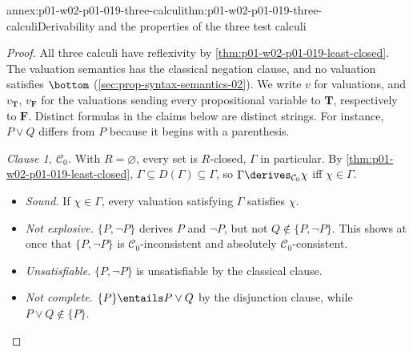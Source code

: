 \begin{annexitem}{annex:p01-w02-p01-019-three-calculi}{thm:p01-w02-p01-019-three-calculi}{Derivability and the properties of the three test calculi}
\begin{proof}
All three calculi have reflexivity by
\cref{thm:p01-w02-p01-019-least-closed}. The valuation semantics has the
classical negation clause, and no valuation satisfies \(\bottom\)
(\cref{sec:prop-syntax-semantics-02}). We write \(v\) for valuations, and
\(v_{\mathbf T}\), \(v_{\mathbf F}\) for the valuations sending every
propositional variable to \(\mathbf T\), respectively to \(\mathbf F\).
Distinct formulas in the claims below are distinct strings. For instance,
\(P\lor Q\) differs from \(P\) because it begins with a parenthesis.

\emph{Clause 1, \(\mathcal C_0\).} With \(R=\varnothing\), every set is
\(R\)-closed, \(\Gamma\) in particular. By
\cref{thm:p01-w02-p01-019-least-closed},
\(\Gamma\subseteq D(\Gamma)\subseteq\Gamma\), so
\(\Gamma\derives_{\mathcal C_0}\chi\) iff \(\chi\in\Gamma\).
\begin{itemize}
  \item \emph{Sound.} If \(\chi\in\Gamma\), every valuation satisfying
        \(\Gamma\) satisfies \(\chi\).
  \item \emph{Not explosive.} \(\{P,\neg P\}\) derives \(P\) and \(\neg P\),
        but not \(Q\notin\{P,\neg P\}\). This shows at once that
        \(\{P,\neg P\}\) is \(\mathcal C_0\)-inconsistent and absolutely
        \(\mathcal C_0\)-consistent.
  \item \emph{Unsatisfiable.} \(\{P,\neg P\}\) is unsatisfiable by the
        classical clause.
  \item \emph{Not complete.} \(\{P\}\entails P\lor Q\) by the disjunction
        clause, while \(P\lor Q\notin\{P\}\).
\end{itemize}


\end{proof}
\end{annexitem}
